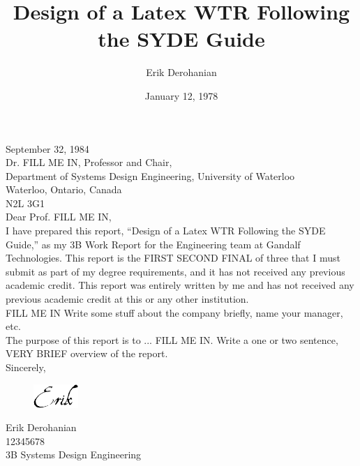 \documentclass[12pt]{article}
\title{Design of a Latex WTR Following the SYDE Guide}
\author{Erik Derohanian}
\date{January 12, 1978}
\begin{document}
	\startindent
	\makewtrtitle

	\stopindent
        \begin{spacing}{1.0}

    	September 32, 1984 \\

    	Dr. FILL ME IN, Professor and Chair, \\
    	Department of Systems Design Engineering, University of Waterloo \\
    	Waterloo, Ontario, Canada \\
    	N2L 3G1\\
    	
    	Dear Prof. FILL ME IN, \\
    
        I have prepared this report, “Design of a Latex WTR Following the SYDE Guide,” as my 3B Work Report for the Engineering team at Gandalf Technologies. This report is the FIRST SECOND FINAL of three that I must submit as part of my degree requirements, and it has not received any previous academic credit. This report was entirely written by me and has not received any previous academic credit at this or any other institution.\\
    	
    	FILL ME IN Write some stuff about the company briefly, name your manager, etc. \\
    	
    	The purpose of this report is to ... FILL ME IN. Write a one or two sentence, VERY BRIEF overview of the report. \\

    	Sincerely,
    
    	\begin{figure}[!ht]
        \includegraphics[width=0.15\textwidth]{signature}
        \end{figure}
    	
    	Erik Derohanian \\
    	12345678 \\
    	3B Systems Design Engineering

	\end{spacing}
	\newpage
	\startindent
\end{document}
